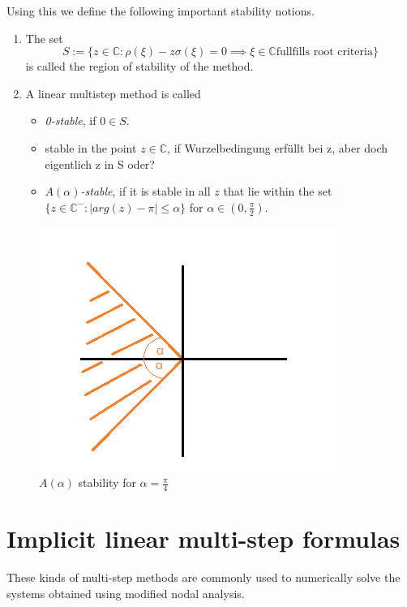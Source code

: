 	Using this we define the following important stability notions.
	\begin{definition}
		\begin{enumerate}
			\item 
			The set
			\begin{equation}
				S := \{z \in \mathbb{C} : \rho(\xi) - z \sigma(\xi) = 0 \implies \xi \in \mathbb{C} \text{fullfills root criteria}\}
			\end{equation}
			is called the region of stability of the method.
			\item 
			A linear multistep method is called
			\begin{itemize}
				\item \emph{0-stable}, if $0 \in S$.
				\item stable in the point $z \in \mathbb{C}$, if Wurzelbedingung erfüllt bei z, aber doch eigentlich z in S oder?
				\item \emph{$A(\alpha)$-stable}, if it is stable in all $z$ that lie within the set $\{z \in \mathbb{C}^- : |arg(z)-\pi| \leq \alpha\}$ for $\alpha \in (0, \frac{\pi}{2})$.		 
			\end{itemize}
		\end{enumerate}
	\end{definition}
	
	\begin{figure}[H]
		\centering
		\includegraphics[width=0.3\linewidth]{screenshot021}
		\caption{$A(\alpha)$ stability for $\alpha = \frac{\pi}{4}$}
		\label{fig:screenshot021}
	\end{figure}
	

\section{Implicit linear multi-step formulas}
These kinds of multi-step methods are commonly used to numerically solve the systems obtained using modified nodal analysis.

